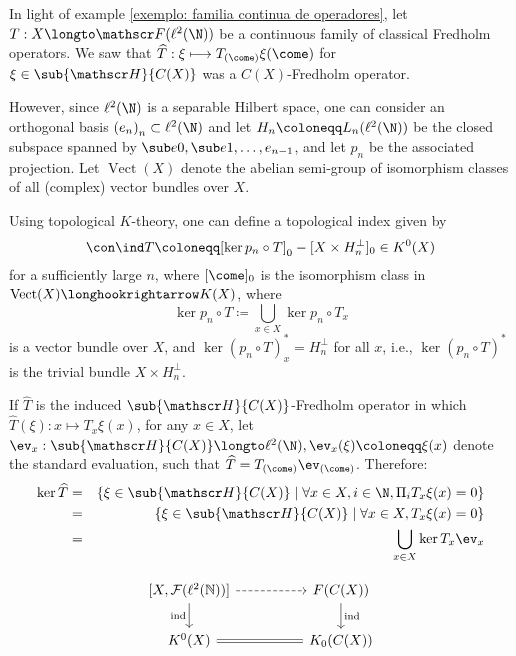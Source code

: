 \begin{observacao}
	In light of example \ref{exemplo: familia continua de operadores}, let $T:X \longto \mathscr F(\ell^2(\N))$ be a continuous family of classical Fredholm operators. We saw that $\widehat T : \xi \longmapsto T_{(\come)}{\xi(\come)}$ for $\xi \in \sub{\mathscr H}{C(X)}$ was a $C(X)$-Fredholm operator. 
	
	However, since $\ell^2(\N)$ is a separable Hilbert space, one can consider an orthogonal basis $\left(e_n\right)_n \subset \ell^2(\N)$ and let $H_n\coloneqq L_n(\ell^2(\N))$ be the closed subspace spanned by $\sub e0, \sub e1, \ldots, e_{n-1}$, and let $p_n$ be the associated projection. Let $\operatorname{Vect}(X)$ denote the abelian semi-group of isomorphism classes of all (complex) vector bundles over $X$. 
	
	Using topological $K$-theory, one can define a topological  index given by
	\begin{equation*}
		\con\ind T \coloneqq [\ker p_n\circ T]_{0} - [X \times H^\perp_n]_0 \in K^0(X)
	\end{equation*}
	for a sufficiently large $n$, where $[\come]_{0}$ is the isomorphism class in $\operatorname{Vect}(X) \longhookrightarrow K(X)$, where 
	\begin{equation*}
		\ker p_n\circ T \coloneqq \bigcup_{x\in X} \ker p_n\circ T_x
	\end{equation*}
	is a vector bundle over $X$, and $\ker (p_n\circ T)^*_x = H_n^{\perp}$ for all $x$, i.e., $\ker (p_n\circ T)^*$ is the trivial bundle $X \times H_n^\perp$.
	
	If $\widehat{T}$ is the induced $\sub{\mathscr H}{C(X)}$-Fredholm operator in which $\widehat{T}(\xi): x\longmapsto T_x\xi(x)$, for any $x\in X$, let $\ev_x : \sub{\mathscr H}{C(X)} \longto \ell^2(\N), \ev_x(\xi) \coloneqq \xi(x)$ denote the standard evaluation, such that $\widehat{T} = T_{(\come)}\ev_{(\come)}$. Therefore:
	\begin{eqnarray*}
		\ker \widehat{T} &=& \{\xi \in \sub{\mathscr H}{C(X)} \mid \forall x \in X, i\in \N, \Pi_i T_x\xi(x) = 0\} \\
		&=& \{\xi \in \sub{\mathscr H}{C(X)} \mid \forall x \in X, T_x\xi(x) = 0\} \\
		&=& \bigcup_{x\in X} \ker T_x\ev_x
	\end{eqnarray*}
	\end{observacao}
	
	\begin{equation*}
	\begin{tikzcd}
		{[X,\mathcal F(\ell^2(\mathbb N))]} \arrow[d, "\text{ind}"'] \arrow[rr, dashed] &  & F(C(X)) \arrow[d, "\text{ind}"] \\
		K^0(X) \arrow[rr, equal]                                          &  & K_0(C(X))                      
		\end{tikzcd}
	\end{equation*}